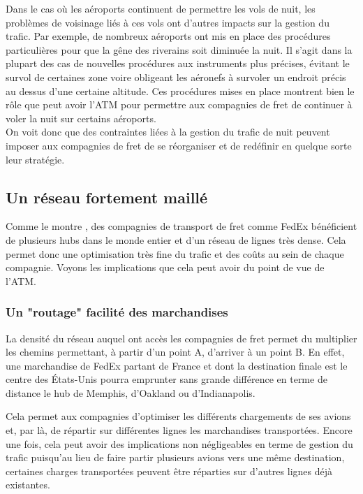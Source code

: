 Dans le cas où les aéroports continuent de permettre les vols de nuit, les problèmes de voisinage liés à ces vols ont d'autres impacts sur la gestion du trafic. Par exemple, de nombreux aéroports ont mis en place des procédures particulières pour que la gêne des riverains soit diminuée la nuit. Il s'agit dans la plupart des cas de nouvelles procédures aux instruments plus précises, évitant le survol de certaines zone voire obligeant les aéronefs à survoler un endroit précis au dessus d'une certaine altitude. Ces procédures mises en place montrent bien le rôle que peut avoir l'ATM pour permettre aux compagnies de fret de continuer à voler la nuit sur certains aéroports.\\

On voit donc que des contraintes liées à la gestion du trafic de nuit peuvent imposer aux compagnies de fret de se réorganiser et de redéfinir en quelque sorte leur stratégie.

\subsection{Un réseau fortement maillé}

Comme le montre \cite{O'Kelly20141}, des compagnies de transport de fret comme FedEx bénéficient de plusieurs hubs dans le monde entier et d'un réseau de lignes très dense. Cela permet donc une optimisation très fine  du trafic et des coûts au sein de chaque compagnie. Voyons les implications que cela peut avoir du point de vue de l'ATM.

\subsubsection{Un "routage" facilité des marchandises}

La densité du réseau auquel ont accès les compagnies de fret permet du multiplier les chemins permettant, à partir d'un point A, d'arriver à un point B. En effet, une marchandise de FedEx partant de France et dont la destination finale est le centre des États-Unis pourra emprunter sans grande différence en terme de distance le hub de Memphis, d'Oakland ou d'Indianapolis.

Cela permet aux compagnies d'optimiser les différents chargements de ses avions et, par là, de répartir sur différentes lignes les marchandises transportées. Encore une fois, cela peut avoir des implications non négligeables en terme de gestion du trafic puisqu'au lieu de faire partir plusieurs avions vers une même destination, certaines charges transportées peuvent être réparties sur d'autres lignes déjà existantes.

